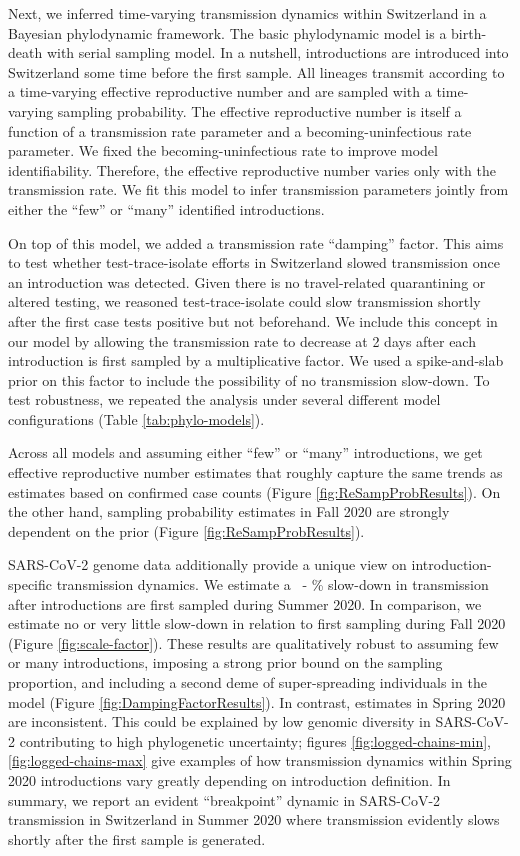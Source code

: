 \documentclass[9pt,twoside,lineno]{pnas-new} %
\begin{document}
Next, we inferred time-varying transmission dynamics within Switzerland in a Bayesian phylodynamic framework. The basic phylodynamic model is a birth-death with serial sampling model. In a nutshell, introductions are introduced into Switzerland some time before the first sample. All lineages transmit according to a time-varying effective reproductive number and are sampled with a time-varying sampling probability. The effective reproductive number is itself a function of a transmission rate parameter and a becoming-uninfectious rate parameter. We fixed the becoming-uninfectious rate to improve model identifiability. Therefore, the effective reproductive number varies only with the transmission rate. We fit this model to infer transmission parameters jointly from either the ``few'' or ``many'' identified introductions.

On top of this model, we added a transmission rate ``damping'' factor. This aims to test whether test-trace-isolate efforts in Switzerland slowed transmission once an introduction was detected. Given there is no travel-related quarantining or altered testing, we reasoned test-trace-isolate could slow transmission shortly after the first case tests positive but not beforehand. We include this concept in our model by allowing the transmission rate to decrease at 2 days after each introduction is first sampled by a multiplicative factor. We used a spike-and-slab prior on this factor to include the possibility of no transmission slow-down. To test robustness, we repeated the analysis under several different model configurations (Table \ref{tab:phylo-models}).

Across all models and assuming either ``few'' or ``many'' introductions, we get effective reproductive number estimates that roughly capture the same trends as estimates based on confirmed case counts (Figure \ref{fig:ReSampProbResults}). On the other hand, sampling probability estimates in Fall 2020 are strongly dependent on the prior (Figure \ref{fig:ReSampProbResults}).

SARS-CoV-2 genome data additionally provide a unique view on introduction-specific transmission dynamics. We estimate a \summermaxdamplingpercentmedianCHEnosampUB\ - \summermindamplingpercentmedianCHEnosampUB\% slow-down in transmission after introductions are first sampled during Summer 2020. In comparison, we estimate no or very little slow-down in relation to first sampling during Fall 2020 (Figure \ref{fig:scale-factor}). These results are qualitatively robust to assuming few or many introductions, imposing a strong prior bound on the sampling proportion, and including a second deme of super-spreading individuals in the model (Figure \ref{fig:DampingFactorResults}). In contrast, estimates in Spring 2020 are inconsistent. This could be explained by low genomic diversity in SARS-CoV-2 contributing to high phylogenetic uncertainty; figures \ref{fig:logged-chains-min}, \ref{fig:logged-chains-max} give examples of how transmission dynamics within Spring 2020 introductions vary greatly depending on introduction definition. In summary, we report an evident ``breakpoint'' dynamic in SARS-CoV-2 transmission in Switzerland in Summer 2020 where transmission evidently slows shortly after the first sample is generated.
\end{document}
